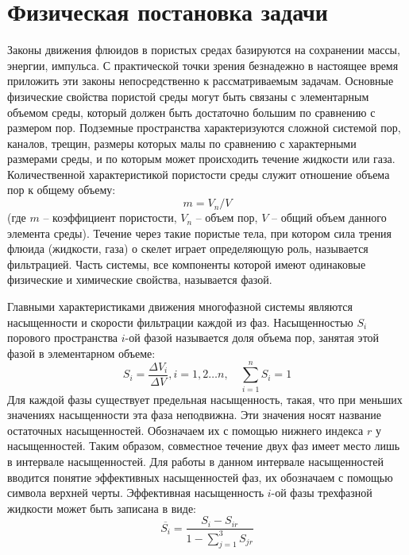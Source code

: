 %
\section{Физическая постановка задачи}
%
%
	Законы движения флюидов в пористых средах базируются на сохранении
массы, энергии, импульса. С практической точки зрения безнадежно в настоящее
время приложить эти законы непосредственно к рассматриваемым задачам. Основные
физические свойства пористой среды могут быть связаны с элементарным
объемом среды, который должен быть достаточно большим по сравнению с размером
пор. Подземные пространства характеризуются сложной системой пор, каналов,
трещин, размеры которых малы по сравнению с характерными размерами среды, и по
которым может происходить течение жидкости или газа. Количественной
характеристикой пористости среды
служит отношение объема пор к общему объему:
%
	$$m=V_n/V$$
%	 	
(где $m$ -- коэффициент пористости, $V_n$ -- объем пор, $V$ -- общий объем
данного
элемента среды).
%
Течение через такие пористые тела, при котором сила трения флюида
(жидкости, газа) о скелет играет определяющую роль, называется фильтрацией.
Часть системы, все компоненты которой имеют
одинаковые физические и химические свойства, называется фазой. 

Главными характеристиками движения многофазной системы являются насыщенности и
скорости фильтрации каждой из фаз. Насыщенностью $S_i$  порового пространства
$i$-ой фазой называется доля объема пор, занятая этой фазой в элементарном
объеме:
%
\begin{equation} 
S_i=\frac{\Delta V_i}{\Delta V}, i=1,2\ldots n,{\quad}\sum_{i=1}^{n}S_i=1 
\end{equation}
%
Для каждой фазы существует предельная насыщенность, такая, что при меньших
значениях насыщенности эта фаза неподвижна. Эти значения носят название остаточных 
насыщенностей. Обозначаем их с помощью нижнего индекса $r$ у насыщенностей. Таким 
образом, совместное течение двух фаз имеет место лишь в интервале насыщенностей.
Для работы в данном интервале насыщенностей вводится понятие эффективных 
насыщенностей фаз, их обозначаем с помощью символа верхней черты. Эффективная насыщенность 
$i$-ой фазы трехфазной жидкости может быть записана в виде:
$$\overline{S_i}={\frac{S_i-S_{ir}}{1-\sum_{j=1}^{3}S_{jr}}}$$

